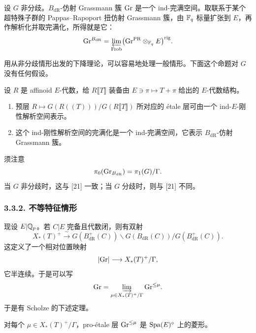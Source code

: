 \begin{corollary}\label{cor:3.11}
设 $G$ 非分歧。$B_{\mathrm{dR}}$-仿射 Grassmann 簇 $\mathrm{Gr}$ 是一个 ind-完满空间。取联系于某个超特殊子群的 Pappas–Rapoport 扭仿射 Grassmann 簇，由 $\mathbb{F}_q$ 标量扩张到 $E$，再作解析化并取完满化，所得就是它：
\[
  \mathrm{Gr}^{B_{\mathrm{dR}}}=\varprojlim_{\mathrm{Frob}}\bigl(\mathrm{Gr}^{\mathrm{PR}}\otimes_{\mathbb{F}_q}E\bigr)^{\mathrm{rig}}.
\]
\end{corollary}

用从非分歧情形出发的下降理论，可以容易地处理一般情形。下面这个命题对 $G$ 没有任何假设。

\begin{proposition}\label{prop:3.12}
设 $R$ 是 affinoid $E$-代数，给 $R\llbracket T\rrbracket$ 装备由 $E\ni\pi\mapsto T+\pi$ 给出的 $E$-代数结构。
\begin{enumerate}[label=(\arabic*)]
  \item 预层 $R\mapsto G(R((T)))/G(R\llbracket T\rrbracket)$ 所对应的 étale 层可由一个 ind-$E$-刚性解析空间表示。
  \item 这个 ind-刚性解析空间的完满化是一个 ind-完满空间，它表示 $B_{\mathrm{dR}}$-仿射 Grassmann 簇。
\end{enumerate}
\end{proposition}

\begin{remark}\label{rem:3.13}
须注意
\[
  \pi_0(\mathrm{Gr}_{B_{\mathrm{dR}}})=\pi_1(G)/\Gamma .
\]
当 $G$ 非分歧时，这与 [21] 一致；当 $G$ 分歧时，则与 [21] 不同。
\end{remark}

\subsubsection*{3.3.2. 不等特征情形}%

\leavevmode 现设 $E|\mathbb{Q}_p$。若 $C|E$ 完备且代数闭，则有双射
\[
  X_*(T)^+\xrightarrow{\ \sim\ }G(B_{\mathrm{dR}}^+(C))\backslash G(B_{\mathrm{dR}}(C))/G(B_{\mathrm{dR}}^+(C)).
\]
这定义了一个相对位置映射
\[
  |\mathrm{Gr}|\longrightarrow X_*(T)^+/\Gamma,
\]
它半连续。于是可以写
\[
  \mathrm{Gr}=\varinjlim_{\mu\in X_*(T)^+/\Gamma}\mathrm{Gr}^{\le\mu}.
\]
于是有 Scholze 的下述定理。

\begin{theorem}[{[27]}]\label{thm:3.14}
对每个 $\mu\in X_*(T)^+/\Gamma$，pro-étale 层 $\mathrm{Gr}^{\le\mu}$ 是 $\mathrm{Spa}(E)^{\diamond}$ 上的菱形。
\end{theorem}

